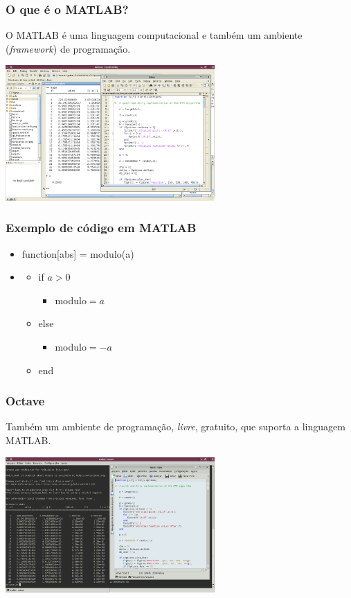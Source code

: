 \documentclass[hyperref={pdfpagelabels=false}]{beamer}
\begin{document}
\begin{frame}
	\frametitle{O que é o MATLAB?}
   \begin{center}
		O MATLAB é uma linguagem computacional e também um ambiente (\emph{framework}) de programação.
		
		\includegraphics[width=8cm]{img/matlab.png}
   \end{center}
\end{frame}
\begin{frame}
   \frametitle{Exemplo de código em MATLAB}
   \begin{center}
	\begin{itemize}
		\item[] function[abs] = modulo(a)
		\item[]
		\begin{itemize}
			\item[] if $a > 0$
			\begin{itemize}
				\item[] modulo$=a$
		   \end{itemize}
		   \item[] else
		   \begin{itemize}
				\item[] modulo$=-a$
		   \end{itemize}
		   \item[] end
		\end{itemize}
	\end{itemize}
	\end{center}
\end{frame}
\begin{frame}
   \frametitle{Octave}
   Também um ambiente de programação, \emph{livre}, gratuito, que suporta a linguagem MATLAB.
   \begin{center}
      \includegraphics[width=8cm]{img/octave.png}
   \end{center}
\end{frame}
\end{document}
